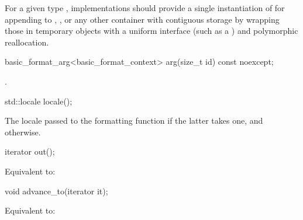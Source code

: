 \pnum
\recommended
For a given type ,
implementations should provide
a single instantiation of 
for appending to
,
,
or any other container with contiguous storage
by wrapping those in temporary objects with a uniform interface
(such as a ) and polymorphic reallocation.

%
\begin{itemdecl}
basic_format_arg<basic_format_context> arg(size_t id) const noexcept;
\end{itemdecl}

\begin{itemdescr}
\pnum
\returns
{}.
\end{itemdescr}

%
\begin{itemdecl}
std::locale locale();
\end{itemdecl}

\begin{itemdescr}
\pnum
\returns
The locale passed to the formatting function
if the latter takes one,
and  otherwise.
\end{itemdescr}

%
\begin{itemdecl}
iterator out();
\end{itemdecl}

\begin{itemdescr}
\pnum
\effects
Equivalent to: 
\end{itemdescr}

%
\begin{itemdecl}
void advance_to(iterator it);
\end{itemdecl}

\begin{itemdescr}
\pnum
\effects
Equivalent to: 
\end{itemdescr}

